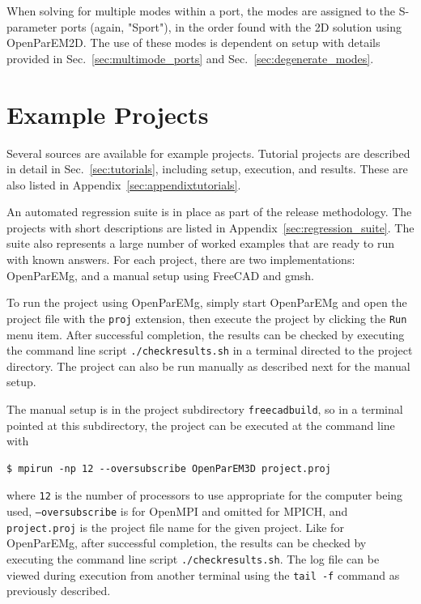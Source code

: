 \documentclass[titlepage]{article}
\renewcommand\_{\textunderscore\linebreak[1]}
\begin{document}
When solving for multiple modes within a port, the modes are assigned to the S-parameter ports (again, "Sport"), in the order found with the 2D solution using OpenParEM2D.  The use of these modes is dependent on setup with details provided in Sec.~\ref{sec:multimode_ports} and Sec.~\ref{sec:degenerate_modes}.

\section{Example Projects}

Several sources are available for example projects.  Tutorial projects are described in detail in Sec.~\ref{sec:tutorials}, including setup, execution, and results.  These are also listed in Appendix~\ref{sec:appendixtutorials}.

An automated regression suite is in place as part of the release methodology. The projects with short descriptions are listed in Appendix~\ref{sec:regression_suite}.  The suite also represents a large number of worked examples that are ready to run with known answers.  For each project, there are two implementations: OpenParEMg, and a manual setup using FreeCAD and gmsh.

To run the project using OpenParEMg, simply start OpenParEMg and open the project file with the \texttt{proj} extension, then execute the project by clicking the \texttt{Run} menu item.  After successful completion, the results can be checked by executing the command line script \texttt{./check\_results.sh} in a terminal directed to the project directory.  The project can also be run manually as described next for the manual setup.

The manual setup is in the project subdirectory \texttt{freecad\_build}, so in a terminal pointed at this subdirectory, the project can be executed at the command line with
\begin{Verbatim}[fontsize=\small]
   $ mpirun -np 12 --oversubscribe OpenParEM3D project.proj
\end{Verbatim}
where \texttt{12} is the number of processors to use appropriate for the computer being used, \texttt{--oversubscribe} is for OpenMPI and omitted for MPICH, and \texttt{project.proj} is the project file name for the given project.  Like for OpenParEMg, after successful completion, the results can be checked by executing the command line script \texttt{./check\_results.sh}.  The log file can be viewed during execution from another terminal using the \texttt{tail -f} command as previously described.
\end{document}
